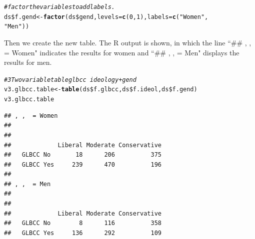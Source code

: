 \documentclass[11pt,openany]{book}\usepackage[]{graphicx}\usepackage[]{color}
\makeatletter
\newcommand{\hlnum}[1]{\textcolor[rgb]{0.686,0.059,0.569}{#1}}%
\newcommand{\hlstr}[1]{\textcolor[rgb]{0.192,0.494,0.8}{#1}}%
\newcommand{\hlcom}[1]{\textcolor[rgb]{0.678,0.584,0.686}{\textit{#1}}}%
\newcommand{\hlopt}[1]{\textcolor[rgb]{0,0,0}{#1}}%
\newcommand{\hlstd}[1]{\textcolor[rgb]{0.345,0.345,0.345}{#1}}%
\newcommand{\hlkwb}[1]{\textcolor[rgb]{0.69,0.353,0.396}{#1}}%
\newcommand{\hlkwc}[1]{\textcolor[rgb]{0.333,0.667,0.333}{#1}}%
\newcommand{\hlkwd}[1]{\textcolor[rgb]{0.737,0.353,0.396}{\textbf{#1}}}%
\newenvironment{kframe}{%
 \def\at@end@of@kframe{}%
 \ifinner\ifhmode%
  \def\at@end@of@kframe{\end{minipage}}%
  \begin{minipage}{\columnwidth}%
 \fi\fi%
 \def\FrameCommand##1{\hskip\@totalleftmargin \hskip-\fboxsep
 \colorbox{shadecolor}{##1}\hskip-\fboxsep
     \hskip-\linewidth \hskip-\@totalleftmargin \hskip\columnwidth}%
 \MakeFramed {\advance\hsize-\width
   \@totalleftmargin\z@ \linewidth\hsize
   \@setminipage}}%
 {\par\unskip\endMakeFramed%
 \at@end@of@kframe}
\newenvironment{knitrout}{}{} %
\renewenvironment{knitrout}{\begin{singlespace}}{\end{singlespace}}
\makeatother
\begin{document}
\begin{knitrout}
\color{fgcolor}\begin{kframe}
\begin{alltt}
\hlcom{# factor the variables to add labels.}
\hlstd{ds}\hlopt{\$}\hlstd{f.gend} \hlkwb{<-} \hlkwd{factor}\hlstd{(ds}\hlopt{\$}\hlstd{gend,} \hlkwc{levels} \hlstd{=} \hlkwd{c}\hlstd{(}\hlnum{0}\hlstd{,} \hlnum{1}\hlstd{),} \hlkwc{labels} \hlstd{=} \hlkwd{c}\hlstd{(}\hlstr{"Women"}\hlstd{,}
    \hlstr{"Men"}\hlstd{))}
\end{alltt}
\end{kframe}
\end{knitrout}

\noindent Then we create the new table.  The R output is shown, in which the line ``\#\# ,  ,  = Women" indicates the results for women and ``\#\# ,  ,  = Men" displays the results for men.

\begin{knitrout}
\color{fgcolor}\begin{kframe}
\begin{alltt}
\hlcom{# 3 Two variable table glbcc~ideology+gend}
\hlstd{v3.glbcc.table} \hlkwb{<-} \hlkwd{table}\hlstd{(ds}\hlopt{\$}\hlstd{f.glbcc, ds}\hlopt{\$}\hlstd{f.ideol, ds}\hlopt{\$}\hlstd{f.gend)}
\hlstd{v3.glbcc.table}
\end{alltt}
\begin{verbatim}
## , ,  = Women
## 
##            
##             Liberal Moderate Conservative
##   GLBCC No       18      206          375
##   GLBCC Yes     239      470          196
## 
## , ,  = Men
## 
##            
##             Liberal Moderate Conservative
##   GLBCC No        8      116          358
##   GLBCC Yes     136      292          109
\end{verbatim}
\end{kframe}
\end{knitrout}
\end{document}
